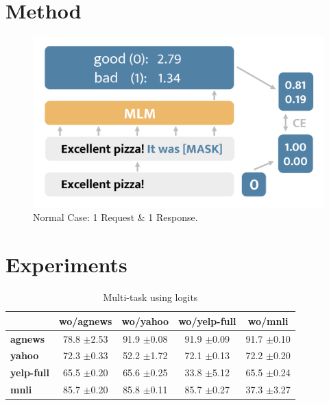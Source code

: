 \documentclass[11pt,a4paper]{article}
\begin{document}
\section{Method}

\begin{figure}[ht]
	\centering
	\includegraphics[width=\linewidth]{mlm_classification}
	\caption{Normal Case: 1 Request \& 1 Response.}
	\label{normal_case}
\end{figure}


\section{Experiments}

\begin{table}[ht]
	\fontsize{7}{10}
	\selectfont
	\begin{tabular}{lcccc}
		\toprule
		& \textbf{wo/agnews} & \textbf{wo/yahoo} & \textbf{wo/yelp-full} & \textbf{wo/mnli} \\
		\hline
		\textbf{agnews}    & 78.8 \tiny$\pm$2.53        & 91.9 \tiny$\pm$0.08        & 91.9   \tiny$\pm$0.09          & 91.7 \tiny$\pm$0.10       \\
		\textbf{yahoo}     & 72.3 \tiny$\pm$0.33        & 52.2 \tiny$\pm$1.72        & 72.1   \tiny$\pm$0.13          & 72.2 \tiny$\pm$0.20       \\
		\textbf{yelp-full} & 65.5 \tiny$\pm$0.20        & 65.6 \tiny$\pm$0.25        & 33.8   \tiny$\pm$5.12          & 65.5 \tiny$\pm$0.24       \\
		\textbf{mnli}      & 85.7 \tiny$\pm$0.20        & 85.8 \tiny$\pm$0.11        & 85.7   \tiny$\pm$0.27          & 37.3 \tiny$\pm$3.27      \\
		\bottomrule
	\end{tabular}
\caption{Multi-task using logits}\label{tab:multi-use-logits-summary}
\end{table}
\end{document}
